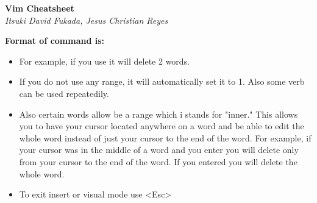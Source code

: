 \documentclass{article}
\begin{document}
\begin{center}
\LARGE\textbf{Vim Cheatsheet}\\
\textit{Itsuki David Fukada, Jesus Christian Reyes}
\end{center}

\begin{framed}
\begin{center}
\Large\textbf{Format of command is: }
\end{center}
\begin{itemize}
\item For example, if you use  \normalfont{,} it will delete 2 words.\\
\item If you do not use any range, it will automatically set it to 1. Also some verb can be used repeatedily.\\
\item Also certain words allow   be a range which i stands for "inner." This allows you to have your
cursor located anywhere on a word and be able to edit the whole word instead of just your cursor to the
end of the word. For example, if your cursor was in the middle of a word and you enter \normalfont{,} you will
delete only from your cursor to the end of the word. If you entered \normalfont{,} you will delete the whole word.
\item To exit insert or visual mode use \textless Esc\textgreater \\
\end{itemize}
\end{framed}
\end{document}
